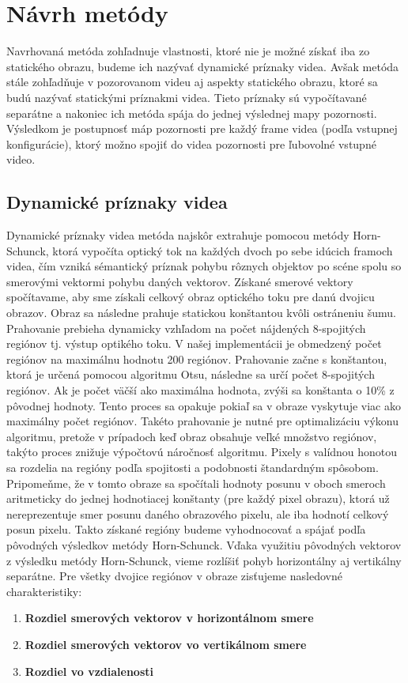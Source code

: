 \section{Návrh metódy}
Navrhovaná metóda zohľadnuje vlastnosti, ktoré nie je možné získať iba zo statického obrazu, budeme ich nazývať dynamické príznaky videa.
Avšak metóda stále zohľadňuje v pozorovanom videu aj aspekty statického obrazu, ktoré sa budú nazývať statickými príznakmi videa.
Tieto príznaky sú vypočítavané separátne a nakoniec ich metóda spája do jednej výslednej mapy pozornosti. Výsledkom je postupnosť máp pozornosti pre každý frame videa (podľa vstupnej konfigurácie), ktorý možno spojiť do videa pozornosti pre ľubovolné vstupné video.

\subsection{Dynamické príznaky videa}
Dynamické príznaky videa metóda najskôr extrahuje pomocou metódy Horn-Schunck\cite{horn-struct2}, ktorá vypočíta optický tok na každých dvoch po sebe idúcich framoch videa, čím vzniká sémantický príznak pohybu rôznych objektov po scéne spolu so smerovými vektormi pohybu daných vektorov.
Získané smerové vektory spočítavame, aby sme získali celkový obraz optického toku pre danú dvojicu obrazov.
Obraz sa následne prahuje statickou konštantou kvôli ostráneniu šumu.
Prahovanie prebieha dynamicky vzhľadom na počet nájdených 8-spojitých regiónov tj. výstup optikého toku. V našej implementácii je obmedzený počet regiónov na maximálnu hodnotu 200 regiónov.
Prahovanie začne s konštantou, ktorá je určená pomocou algoritmu Otsu\cite{otsu}, následne sa určí počet 8-spojitých regiónov. Ak je počet väčší ako maximálna hodnota, zvýši sa konštanta o 10\% z pôvodnej hodnoty.
Tento proces sa opakuje pokiaľ sa v obraze vyskytuje viac ako maximálny počet regiónov.
Takéto prahovanie je nutné pre optimalizáciu výkonu algoritmu, pretože v prípadoch keď obraz obsahuje veľké množstvo regiónov, takýto proces znižuje výpočtovú náročnosť algoritmu.
Pixely s valídnou honotou sa rozdelia na regióny podľa spojitosti a podobnosti štandardným spôsobom.
Pripomeňme, že v tomto obraze sa spočítali hodnoty posunu v oboch smeroch aritmeticky do jednej hodnotiacej konštanty (pre každý pixel obrazu), ktorá už nereprezentuje smer posunu daného obrazového pixelu, ale iba hodnotí celkový posun pixelu.
Takto získané regióny budeme vyhodnocovať a spájať podľa pôvodných výsledkov metódy Horn-Schunck.
Vďaka využitiu pôvodných vektorov z výsledku metódy Horn-Schunck, vieme rozlíšiť pohyb horizontálny aj vertikálny separátne.
Pre všetky dvojice regiónov v obraze zisťujeme nasledovné charakteristiky:
\begin{enumerate}
  \item\textbf{Rozdiel smerových vektorov v horizontálnom smere}
  \item\textbf{Rozdiel smerových vektorov vo vertikálnom smere}
  \item\textbf{Rozdiel vo vzdialenosti}
\end{enumerate}
